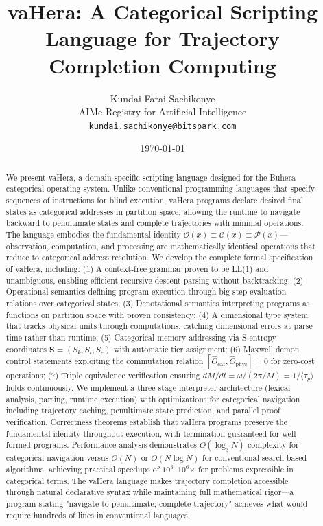 \documentclass[twocolumn,10pt]{article}
\title{vaHera: A Categorical Scripting Language for Trajectory Completion Computing}
\author{
Kundai Farai Sachikonye\\
AIMe Registry for Artificial Intelligence\\
\texttt{kundai.sachikonye@bitspark.com}
}
\date{\today}
\newcommand{\Scoord}{\mathbf{S}}
\theoremstyle{definition}
\theoremstyle{remark}
\begin{document}
\maketitle

\begin{abstract}
We present vaHera, a domain-specific scripting language designed for the Buhera categorical operating system. Unlike conventional programming languages that specify sequences of instructions for blind execution, vaHera programs declare desired final states as categorical addresses in partition space, allowing the runtime to navigate backward to penultimate states and complete trajectories with minimal operations. The language embodies the fundamental identity $\mathcal{O}(x) \equiv \mathcal{C}(x) \equiv \mathcal{P}(x)$—observation, computation, and processing are mathematically identical operations that reduce to categorical address resolution. We develop the complete formal specification of vaHera, including: (1) A context-free grammar proven to be LL(1) and unambiguous, enabling efficient recursive descent parsing without backtracking; (2) Operational semantics defining program execution through big-step evaluation relations over categorical states; (3) Denotational semantics interpreting programs as functions on partition space with proven consistency; (4) A dimensional type system that tracks physical units through computations, catching dimensional errors at parse time rather than runtime; (5) Categorical memory addressing via S-entropy coordinates $\Scoord = (S_k, S_t, S_e)$ with automatic tier assignment; (6) Maxwell demon control statements exploiting the commutation relation $[\hat{O}_{\text{cat}}, \hat{O}_{\text{phys}}] = 0$ for zero-cost operations; (7) Triple equivalence verification ensuring $dM/dt = \omega/(2\pi/M) = 1/\langle\tau_p\rangle$ holds continuously. We implement a three-stage interpreter architecture (lexical analysis, parsing, runtime execution) with optimizations for categorical navigation including trajectory caching, penultimate state prediction, and parallel proof verification. Correctness theorems establish that vaHera programs preserve the fundamental identity throughout execution, with termination guaranteed for well-formed programs. Performance analysis demonstrates $O(\log_3 N)$ complexity for categorical navigation versus $O(N)$ or $O(N \log N)$ for conventional search-based algorithms, achieving practical speedups of $10^3$--$10^6$× for problems expressible in categorical terms. The vaHera language makes trajectory completion accessible through natural declarative syntax while maintaining full mathematical rigor—a program stating "navigate to penultimate; complete trajectory" achieves what would require hundreds of lines in conventional languages.
\end{abstract}
\end{document}

